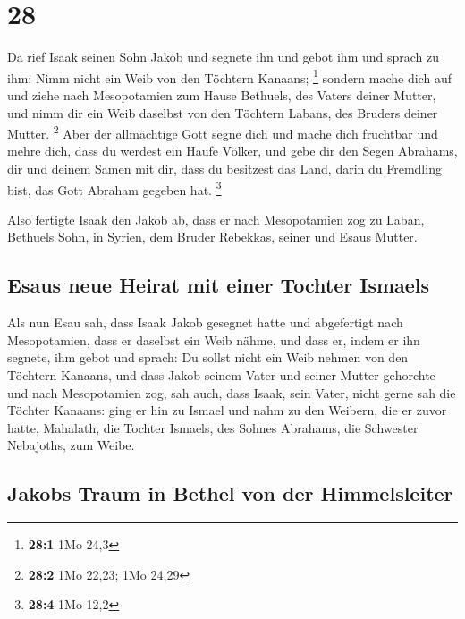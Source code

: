 \hypertarget{section-27}{%
\section{28}\label{section-27}}

 Da rief Isaak seinen Sohn Jakob und segnete ihn und gebot
ihm und sprach zu ihm: Nimm nicht ein Weib von den Töchtern Kanaans;
\footnote{\textbf{28:1} 1Mo 24,3}  sondern mache dich auf
und ziehe nach Mesopotamien zum Hause Bethuels, des Vaters deiner
Mutter, und nimm dir ein Weib daselbst von den Töchtern Labans, des
Bruders deiner Mutter. \footnote{\textbf{28:2} 1Mo 22,23; 1Mo 24,29}
 Aber der allmächtige Gott segne dich und mache dich
fruchtbar und mehre dich, dass du werdest ein Haufe Völker,
 und gebe dir den Segen Abrahams, dir und deinem Samen mit
dir, dass du besitzest das Land, darin du Fremdling bist, das Gott
Abraham gegeben hat. \footnote{\textbf{28:4} 1Mo 12,2}

 Also fertigte Isaak den Jakob ab, dass er nach
Mesopotamien zog zu Laban, Bethuels Sohn, in Syrien, dem Bruder
Rebekkas, seiner und Esaus Mutter.

\hypertarget{esaus-neue-heirat-mit-einer-tochter-ismaels}{%
\subsection{Esaus neue Heirat mit einer Tochter
Ismaels}\label{esaus-neue-heirat-mit-einer-tochter-ismaels}}

 Als nun Esau sah, dass Isaak Jakob gesegnet hatte und
abgefertigt nach Mesopotamien, dass er daselbst ein Weib nähme, und dass
er, indem er ihn segnete, ihm gebot und sprach: Du sollst nicht ein Weib
nehmen von den Töchtern Kanaans,  und dass Jakob seinem
Vater und seiner Mutter gehorchte und nach Mesopotamien zog,
 sah auch, dass Isaak, sein Vater, nicht gerne sah die
Töchter Kanaans:  ging er hin zu Ismael und nahm zu den
Weibern, die er zuvor hatte, Mahalath, die Tochter Ismaels, des Sohnes
Abrahams, die Schwester Nebajoths, zum Weibe.

\hypertarget{jakobs-traum-in-bethel-von-der-himmelsleiter}{%
\subsection{Jakobs Traum in Bethel von der
Himmelsleiter}\label{jakobs-traum-in-bethel-von-der-himmelsleiter}}

